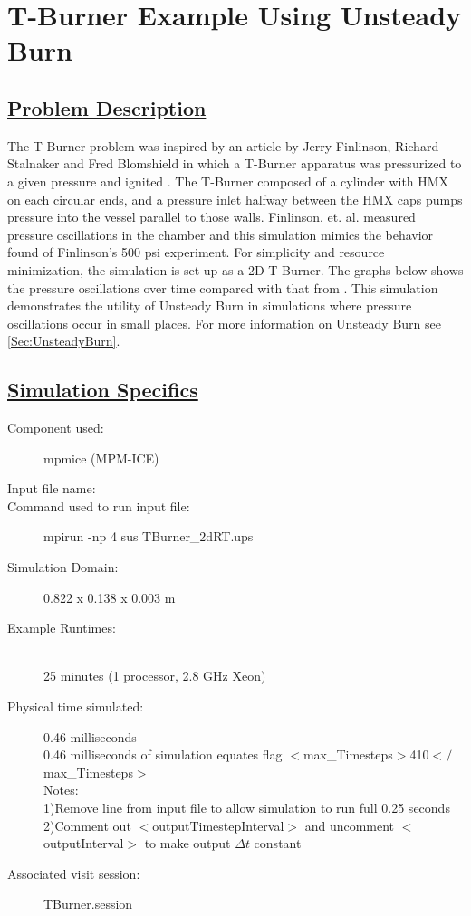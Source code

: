 \newpage
%
\newpage
\section*{\center  T-Burner Example Using Unsteady Burn}
\subsection*{\underline{Problem Description}}
The T-Burner problem was inspired by  an article by Jerry Finlinson, Richard Stalnaker and Fred Blomshield in which a T-Burner apparatus was pressurized to a given pressure and ignited \cite{ref:finlinson1}.  The T-Burner composed of a cylinder with HMX on each circular ends, and a pressure inlet halfway between the HMX caps pumps pressure into the vessel parallel to those walls.  Finlinson, et. al. measured pressure oscillations in the chamber and this simulation mimics the behavior found of Finlinson's 500 psi experiment.  For simplicity and resource minimization, the simulation is set up as a 2D T-Burner.  The graphs below shows the pressure oscillations over time compared with that from \cite{ref:finlinson1}.  This simulation demonstrates the utility of Unsteady Burn in simulations where pressure oscillations occur in small places.  For more information on Unsteady Burn see \ref{Sec:UnsteadyBurn}.

\subsection*{\underline{Simulation Specifics}}
\begin{description}
\item [Component used:] \hfill mpmice (MPM-ICE)
\item [Input file name:] \hfill {}
\item [Command used to run input file:]\hfill mpirun -np 4 sus TBurner\_2dRT.ups

\item [Simulation Domain:]\hfill    0.822 x 0.138 x 0.003 m

\item [Example Runtimes:] \hfill \\
 25 minutes   (1 processor, 2.8 GHz Xeon)\\

\item [Physical time simulated:] \hfill 0.46 milliseconds \\ 
0.46 milliseconds of simulation equates flag $<$max\_Timesteps$>$410$</$max\_Timesteps$>$ \\ %
Notes: \\
1)Remove line from input file to allow simulation to run full 0.25 seconds \\
2)Comment out $<$outputTimestepInterval$>$ and uncomment $<$outputInterval$>$ to make output $\Delta t$ constant \\ 

\item [Associated visit session:] \hfill TBurner.session

\end{description}

